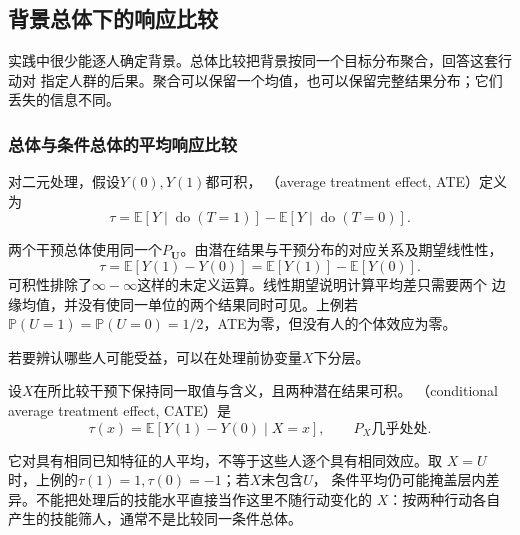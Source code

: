 \subsection{背景总体下的响应比较}
\label{sec:causal-population-response}

实践中很少能逐人确定背景。总体比较把背景按同一个目标分布聚合，回答这套行动对
指定人群的后果。聚合可以保留一个均值，也可以保留完整结果分布；它们丢失的信息不同。

\subsubsection{总体与条件总体的平均响应比较}
\label{sec:causal-average-response}

\begin{definition}[平均处理效应]
  \label{def:causal-average-treatment-effect}
  对二元处理，假设\(Y(0),Y(1)\)都可积，
  （average treatment effect, ATE）定义为
  \begin{equation}
    \tau
    =
    \mathbb E[Y\mid\operatorname{do}(T=1)]
    -
    \mathbb E[Y\mid\operatorname{do}(T=0)].
    \label{eq:causal-ate-interventional}
  \end{equation}
\end{definition}

两个干预总体使用同一个\(P_{\bm U}\)。由潜在结果与干预分布的对应关系及期望线性性，
\begin{equation}
  \tau
  =\mathbb E[Y(1)-Y(0)]
  =\mathbb E[Y(1)]-\mathbb E[Y(0)].
  \label{eq:causal-ate-potential-outcomes}
\end{equation}
可积性排除了\(\infty-\infty\)这样的未定义运算。线性期望说明计算平均差只需要两个
边缘均值，并没有使同一单位的两个结果同时可见。上例若
\(\mathbb P(U=1)=\mathbb P(U=0)=1/2\)，ATE为零，但没有人的个体效应为零。

若要辨认哪些人可能受益，可以在处理前协变量\(X\)下分层。
\begin{definition}[条件平均处理效应]
  \label{def:causal-conditional-average-effect}
  设\(X\)在所比较干预下保持同一取值与含义，且两种潜在结果可积。
  （conditional average treatment effect, CATE）是
  \begin{equation}
    \tau(x)=\mathbb E[Y(1)-Y(0)\mid X=x],
    \qquad P_X\text{几乎处处}.
    \label{eq:causal-cate}
  \end{equation}
\end{definition}
它对具有相同已知特征的人平均，不等于这些人逐个具有相同效应。取
\(X=U\)时，上例的\(\tau(1)=1,\tau(0)=-1\)；若\(X\)未包含\(U\)，
条件平均仍可能掩盖层内差异。不能把处理后的技能水平直接当作这里不随行动变化的
\(X\)：按两种行动各自产生的技能筛人，通常不是比较同一条件总体。

